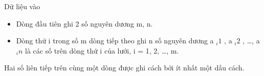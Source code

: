 Dữ liệu vào
\begin{itemize}
	\item     Dòng đầu tiên ghi 2 số nguyên dương m, n.   
	\item     Dòng thứ i trong số m dòng tiếp theo ghi n số nguyên dương a    $_     i1    $    , a    $_     i2    $    , …, a    $_     in    $    là các số trên dòng thứ i của lưới, i = 1, 2, …, m.   
\end{itemize}

   Hai số liên tiếp trên cùng một dòng được ghi cách bởi ít nhất một dấu cách.